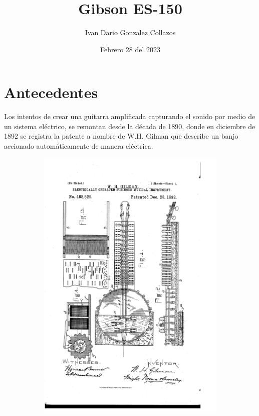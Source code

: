 \documentclass{article}
\title{Gibson ES-150}
\author{Ivan Dario Gonzalez Collazos}
\date{Febrero 28 del 2023}
\begin{document}
\maketitle

\section{Antecedentes}

Los intentos de crear una guitarra amplificada capturando el sonido por medio de un sistema eléctrico, se remontan desde la década de 1890, donde en diciembre de 1892 se registra la patente a nombre de W.H. Gilman que describe un banjo accionado automáticamente de manera eléctrica.\\

\begin{figure}[h]
    \begin{center}
        \begin{subfigure}{0.3\textwidth}
            \includegraphics[scale=0.18]{images/patente1.png}

\end{subfigure}
\end{center}
\end{figure}
\end{document}
